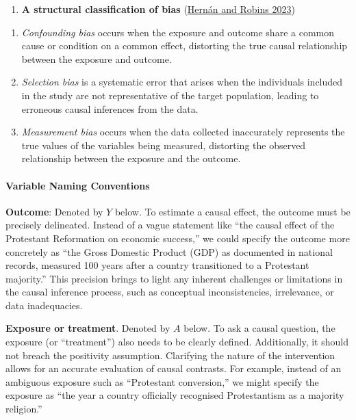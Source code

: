 \documentclass[
  singlecolumn]{article}
\let\oldparagraph\paragraph
\renewcommand{\paragraph}[1]{\oldparagraph{#1}\mbox{}}
\providecommand{\tightlist}{%
  \setlength{\itemsep}{0pt}\setlength{\parskip}{0pt}}\usepackage{longtable,booktabs,array}
\begin{document}
\begin{enumerate}
\def\labelenumi{\arabic{enumi}.}
\setcounter{enumi}{18}
\tightlist
\item
  \textbf{A structural classification of bias}
  (\protect\hyperlink{ref-hernuxe1n2023}{Hernán and Robins 2023})
\end{enumerate}

\begin{enumerate}
\def\labelenumi{\alph{enumi}.}
\item
  \emph{Confounding bias} occurs when the exposure and outcome share a
  common cause or condition on a common effect, distorting the true
  causal relationship between the exposure and outcome.
\item
  \emph{Selection bias} is a systematic error that arises when the
  individuals included in the study are not representative of the target
  population, leading to erroneous causal inferences from the data.
\item
  \emph{Measurement bias} occurs when the data collected inaccurately
  represents the true values of the variables being measured, distorting
  the observed relationship between the exposure and the outcome.
\end{enumerate}

\hypertarget{variable-naming-conventions}{%
\paragraph{\texorpdfstring{\textbf{Variable Naming
Conventions}}{Variable Naming Conventions}}\label{variable-naming-conventions}}

\textbf{Outcome}: Denoted by \(Y\) below. To estimate a causal effect,
the outcome must be precisely delineated. Instead of a vague statement
like ``the causal effect of the Protestant Reformation on economic
success,'' we could specify the outcome more concretely as ``the Gross
Domestic Product (GDP) as documented in national records, measured 100
years after a country transitioned to a Protestant majority.'' This
precision brings to light any inherent challenges or limitations in the
causal inference process, such as conceptual inconsistencies,
irrelevance, or data inadequacies.

\textbf{Exposure or treatment}. Denoted by \(A\) below. To ask a causal
question, the exposure (or ``treatment'') also needs to be clearly
defined. Additionally, it should not breach the positivity assumption.
Clarifying the nature of the intervention allows for an accurate
evaluation of causal contrasts. For example, instead of an ambiguous
exposure such as ``Protestant conversion,'' we might specify the
exposure as ``the year a country officially recognised Protestantism as
a majority religion.''
\end{document}
